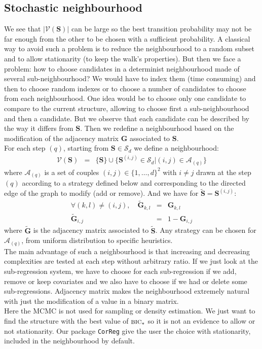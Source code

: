 \documentclass[12pt,a4paper]{report}
\begin{document}
	\subsection{Stochastic neighbourhood}
	We see that $|\mathcal{V}(\boldsymbol{S})|$ can be large so the best transition probability may not be far enough from the other to be chosen with a sufficient probability. A classical way to avoid such a problem is to reduce the neighbourhood to a random subset and to allow stationarity (to keep the walk's properties). But then we face a problem: how to choose candidates in a determinist neighbourhood made of several sub-neighbourhood? We would have to index them (time consuming) and then to choose random indexes or to choose a number of candidates to choose from each neighbourhood. One idea would be to choose only one candidate to compare to the current structure, allowing to choose first a sub-neighbourhood and then a candidate. But we observe that each candidate can be described by the way it differs from $\boldsymbol{S}$. Then we redefine a neighbourhood based on the modification of the adjacency matrix $\boldsymbol{G}$ associated to $\boldsymbol{S}$.\\
	
	For each step $(q)$, starting from $\boldsymbol{S} \in \mathcal{S}_d$ we define a neighbourhood:
		\begin{eqnarray}
		\mathcal{V}(\boldsymbol{S})&=& \{\boldsymbol{S} \}\cup \{ \boldsymbol{S}^{(i,j)} \in \mathcal{S}_d|(i,j) \in \mathcal{A}_{(q)}\} 
	\end{eqnarray}	
	where $\mathcal{A}_{(q)}$ is a set of couples $(i,j) \in \{1,\dots,d \}^2$ with $i\neq j$ drawn at the step $(q)$ according to a strategy defined below and corresponding to the directed edge of the graph to modify (add or remove).
	And we have for  $\tilde{\boldsymbol{S}}=\boldsymbol{S}^{(i,j)}$:
	\begin{eqnarray}
		\forall (k,l)\neq (i,j), \quad	\tilde{\boldsymbol{G}}_{k,l}&=&\boldsymbol{G}_{k,l} \\
		\tilde{\boldsymbol{G}}_{i,j}&=&1-\boldsymbol{G}_{i,j} 
	\end{eqnarray}
	where $\tilde{\boldsymbol{G}}$ is the adjacency matrix associated to $\tilde{\boldsymbol{S}}$. Any strategy can be chosen for $\mathcal{A}_{(q)}$, from uniform distribution to specific heuristics.\\
	
The main advantage of such a neighbourhood is that increasing and decreasing complexities are tested at each step without arbitrary ratio. If we just look at the sub-regression system, we have to choose for each sub-regression if we add, remove or keep covariates and we also have to choose if we had or delete some sub-regressions. Adjacency matrix makes the neighbourhood extremely natural with just the modification of a value in a binary matrix. \\
Here the MCMC is not used for sampling or density estimation. We just want to find the structure with the best value of $\mbox{{\sc bic}}_*$ so it is not an evidence to allow or not stationarity. Our package {\tt CorReg} give the user the choice with stationarity,  included in the neighbourhood by default.
\end{document}
